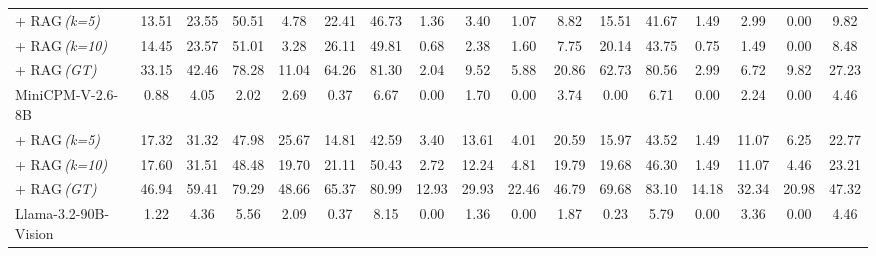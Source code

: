 \begin{table*}[t]
{\begin{tabular}{l|cc|c|c|cc|cc|cc|cc|cc|cc}
\hspace{2em}  + RAG\,\textit{(k=5)} & 13.51 & 23.55 & \colorbox{lightred!75}{50.51} & 4.78 & \colorbox{lightred!75}{22.41} & 46.73 & 1.36 & 3.40 & 1.07 & 8.82 & 15.51 & 41.67 & \colorbox{lightred!75}{1.49} & 2.99 & 0.00 & 9.82 \\

\hspace{2em}  + RAG\,\textit{(k=10)} & 14.45 & 23.57 & 51.01 & 3.28 & 26.11 & 49.81 & 0.68 & 2.38 & 1.60 & 7.75 & 20.14 & 43.75 & 0.75 & 1.49 & 0.00 & 8.48 \\

\hspace{2em}  + RAG\,\textit{(GT)} & 33.15 & 42.46 & 78.28 & 11.04 & 64.26 & 81.30 & 2.04 & 9.52 & 5.88 & 20.86 & 62.73 & 80.56 & 2.99 & 6.72 & 9.82 & 27.23 \\

\midrule
MiniCPM-V-2.6-8B & 0.88 & 4.05 & 2.02 & \colorbox{lightred!75}{2.69} & 0.37 & 6.67 & \colorbox{lightred!75}{0.00} & \colorbox{lightred!75}{1.70} & \colorbox{lightred!75}{0.00} & \colorbox{lightred!75}{3.74} & 0.00 & 6.71 & \colorbox{lightred!75}{0.00} & 2.24 & \colorbox{lightred!75}{0.00} & 4.46 \\

\hspace{2em}  + RAG\,\textit{(k=5)} & 17.32 & 31.32 & 47.98 & 25.67 & 14.81 & 42.59 & 3.40 & 13.61 & 4.01 & \colorbox{lightred!75}{20.59} & 15.97 & 43.52 & \colorbox{lightred!75}{1.49} & 11.07 & 6.25 & 22.77 \\

\hspace{2em}  + RAG\,\textit{(k=10)} & 17.60 & 31.51 & 48.48 & 19.70 & 21.11 & 50.43 & 2.72 & 12.24 & 4.81 & 19.79 & 19.68 & 46.30 & 1.49 & 11.07 & 4.46 & 23.21 \\

\hspace{2em}  + RAG\,\textit{(GT)} & 46.94 & 59.41 & 79.29 & 48.66 & \colorbox{lightred!75}{65.37} & 80.99 & 12.93 & 29.93 & \colorbox{lightred!75}{22.46} & 46.79 & \colorbox{lightred!75}{69.68} & \colorbox{lightred!75}{83.10} & 14.18 & 32.34 & 20.98 & 47.32 \\

\midrule
Llama-3.2-90B-Vision & \colorbox{lightred!75}{1.22} & 4.36 & \colorbox{lightred!75}{5.56} & 2.09 & 0.37 & \colorbox{lightred!75}{8.15} & \colorbox{lightred!75}{0.00} & 1.36 & \colorbox{lightred!75}{0.00} & 1.87 & 0.23 & 5.79 & \colorbox{lightred!75}{0.00} & \colorbox{lightred!75}{3.36} & \colorbox{lightred!75}{0.00} & 4.46 \\


\end{tabular}}
\end{table*}
